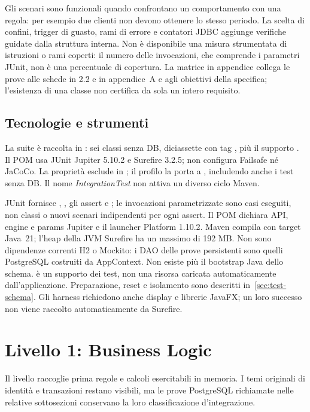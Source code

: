 Gli scenari sono funzionali quando confrontano un comportamento con una
regola: per esempio due clienti non devono ottenere lo stesso periodo.
La scelta di confini, trigger di guasto, rami di errore e contatori JDBC
aggiunge verifiche guidate dalla struttura interna. Non è disponibile una
misura strumentata di istruzioni o rami coperti: il numero delle invocazioni,
che comprende i parametri JUnit, non è una percentuale di copertura.
La matrice in appendice collega le prove alle schede in 2.2 e in appendice~A e agli
obiettivi della specifica; l'esistenza di una classe non certifica da sola
un intero requisito.

\subsection{Tecnologie e strumenti}\label{sec:test-strumenti}
La suite è raccolta in : sei classi
senza DB, diciassette con tag , più il supporto
. Il POM usa JUnit Jupiter 5.10.2 e Surefire 3.2.5;
non configura Failsafe né JaCoCo. La proprietà 
esclude  in ; il profilo
 la porta a , includendo anche i test
senza DB. Il nome \emph{IntegrationTest} non attiva un diverso ciclo Maven.

JUnit fornisce , , gli assert e
; le invocazioni parametrizzate sono casi eseguiti,
non classi o nuovi scenari indipendenti per ogni assert. Il POM dichiara
API, engine e params Jupiter e il launcher Platform 1.10.2. Maven compila
con target Java~21; l'heap della JVM Surefire ha un massimo di 192 MB.
Non sono dipendenze correnti H2 o Mockito: i DAO delle prove persistenti
sono quelli PostgreSQL costruiti da AppContext. Non esiste più il
bootstrap Java dello schema.  è un supporto dei test,
non una risorsa caricata automaticamente dall'applicazione. Preparazione,
reset e isolamento sono descritti in~\ref{sec:test-schema}.
Gli harness richiedono anche display e librerie JavaFX; un loro successo
non viene raccolto automaticamente da Surefire.

\section{Livello 1: Business Logic}\label{sec:test-business}
Il livello raccoglie prima regole e calcoli esercitabili in memoria.
I temi originali di identità e transazioni restano visibili, ma le prove
PostgreSQL richiamate nelle relative sottosezioni conservano la loro
classificazione d'integrazione.

